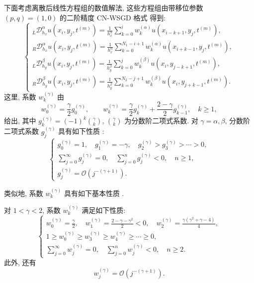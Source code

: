 下面考虑离散后线性方程组的数值解法, 这些方程组由带移位参数 $(p,q)=(1,0)$ 的二阶精度 CN-WSGD 格式 \cite{src:79} 得到:
\[
\left\{
\begin{array}{l}
\displaystyle {}_{L}\mathcal{D}_{h_{x}}^{\alpha}u(x_{i},y_{j},t^{(m)})=\frac{1}{h_{x}^{\alpha}}\sum_{k=0}^{i}w_{k}^{(\alpha)}u(x_{i-k+1},y_{j},t^{(m)}),\\[4mm]
\displaystyle {}_{R}\mathcal{D}_{h_{x}}^{\alpha}u(x_{i},y_{j},t^{(m)})=\frac{1}{h_{x}^{\alpha}}\sum_{k=0}^{N_{1}-i+1}w_{k}^{(\alpha)}u(x_{i+k-1},y_{j},t^{(m)}),\\[4mm]
\displaystyle {}_{L}\mathcal{D}_{h_{y}}^{\beta}u(x_{i},y_{j},t^{(m)})=\frac{1}{h_{y}^{\beta}}\sum_{k=0}^{j}w_{k}^{(\beta)}u(x_{i},y_{j-k+1},t^{(m)}),\\[4mm]
\displaystyle {}_{R}\mathcal{D}_{h_{y}}^{\beta}u(x_{i},y_{j},t^{(m)})=\frac{1}{h_{y}^{\beta}}\sum_{k=0}^{N_{2}-j+1}w_{k}^{(\beta)}u(x_{i},y_{j+k-1},t^{(m)}).
\end{array}
\right.
\]
这里, 系数 $w_{k}^{(\gamma)}$ 由
\[
  w_{0}^{(\gamma)}=\frac{\gamma}{2}g_{0}^{(\gamma)},\qquad
  w_{k}^{(\gamma)}=\frac{\gamma}{2}g_{k}^{(\gamma)}+\frac{2-\gamma}{2}g_{k-1}^{(\gamma)},\quad k\geqslant 1,
\]
给出, 其中 $g_{k}^{(\gamma)}=(-1)^{k}\binom{\gamma}{k}$, $\binom{\gamma}{k}$ 为分数阶二项式系数. 对 $\gamma=\alpha,\beta$, 分数阶二项式系数 $g_{j}^{(\gamma)}$ 具有如下性质 \cite{src:61,src:62,src:66,src:87}:
\begin{equation}
\left\{
\begin{array}{l}
g_{0}^{(\gamma)}=1,\quad g_{1}^{(\gamma)}=-\gamma,\quad g_{2}^{(\gamma)}>g_{3}^{(\gamma)}>\cdots>0,\\[2mm]
\displaystyle \sum_{j=0}^{\infty}g_{j}^{(\gamma)}=0,\quad \sum_{j=0}^{n}g_{j}^{(\gamma)}<0,\quad n\geqslant 1,\\[2mm]
g_{j}^{(\gamma)}=\mathcal{O}(j^{-(\gamma+1)}).
\end{array}
\right.
\label{eq:10-2}
\end{equation}

类似地, 系数 $w_{k}^{(\gamma)}$ 具有如下基本性质 \cite{src:79}.

\begin{lemma}
\label{lem:10-1}
对 $1<\gamma<2$, 系数 $w_{k}^{(\gamma)}$ 满足如下性质:
\[
\left\{
\begin{array}{l}
\displaystyle w_{0}^{(\gamma)}=\frac{\gamma}{2},\quad
w_{1}^{(\gamma)}=\frac{2-\gamma-\gamma^{2}}{2}<0,\quad
w_{2}^{(\gamma)}=\frac{\gamma(\gamma^{2}+\gamma-4)}{4},\\[3mm]
1\geqslant w_{0}^{(\gamma)}\geqslant w_{3}^{(\gamma)}\geqslant w_{4}^{(\gamma)}\geqslant\cdots\geqslant 0,\\[2mm]
\displaystyle \sum_{j=0}^{\infty}w_{j}^{(\gamma)}=0,\quad \sum_{j=0}^{n}w_{j}^{(\gamma)}<0,\quad n\geqslant 2.
\end{array}
\right.
\]
此外, 还有
\[
  w_{j}^{(\gamma)}=\mathcal{O}(j^{-(\gamma+1)}).
\]
\end{lemma}

